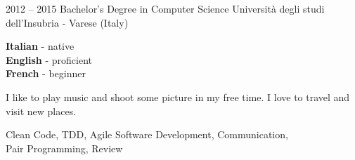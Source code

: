 \documentclass[9pt]{developercv} %
\begin{document}


\begin{entrylist}
	\entry
		{2012 -- 2015}
		{Bachelor's Degree in Computer Science}
		{Università degli studi dell'Insubria - Varese (Italy)}
		{}
\end{entrylist}


\begin{minipage}[t]{0.3\textwidth}
	\vspace{-\baselineskip} %

	
	\textbf{Italian} - native\\
	\textbf{English} - proficient\\
	\textbf{French} - beginner
\end{minipage}
\hfill
\begin{minipage}[t]{0.3\textwidth}
	\vspace{-\baselineskip} %
	
	
	I like to play music and shoot some picture in my free time. I love to travel and visit new places.
\end{minipage}
\hfill
\begin{minipage}[t]{0.3\textwidth}
	\vspace{-\baselineskip} %
	
	
	Clean Code, TDD, Agile Software Development, Communication,\\
	Pair Programming, Review
\end{minipage}

\end{document}
